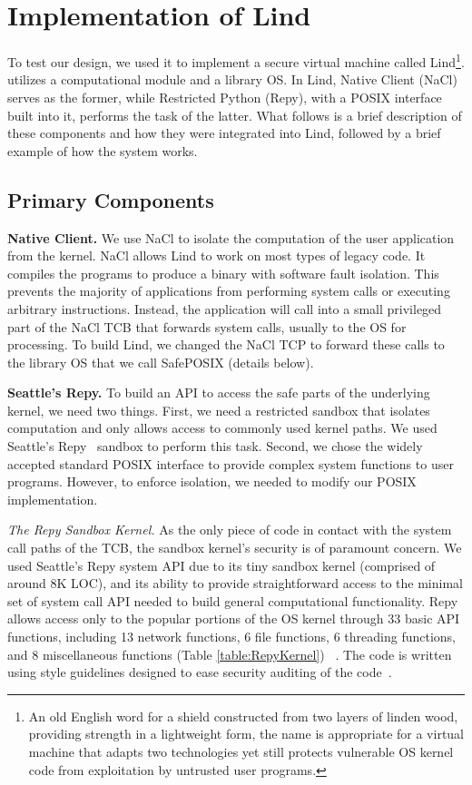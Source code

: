 \section{Implementation of Lind}
\label{sec.implementation}

To test our \lip design, we used it to implement a secure virtual machine
called Lind\footnote{\scriptsize An old English word for a shield constructed from two layers of
linden wood, providing strength in a lightweight form, the name is appropriate for
a virtual machine that adapts two technologies\textendash
yet still protects vulnerable OS kernel code from exploitation by
untrusted user programs.}.
\lip utilizes a computational module and a library OS. In Lind, Native Client (NaCl) serves as the former,
while Restricted Python (Repy), with a POSIX interface built into it, performs the
task of the latter.
What follows is a brief description of these components and how they were integrated
into Lind, followed by a brief example of how the system works.

\subsection{Primary Components}

\textbf{Native Client.}
We use NaCl to isolate the computation of the user application
from the kernel. NaCl allows Lind to work on most types of legacy code.
It compiles the programs to produce a binary with software fault isolation.
This prevents the majority of applications from performing system calls
or executing arbitrary instructions.
Instead, the application will call into a small privileged
part of the NaCl TCB that forwards system calls, usually to the OS for
processing. To build Lind, we changed the NaCl TCP to
forward these calls to the library OS that we call SafePOSIX (details below).

\textbf{Seattle's Repy.}
To build an API to access the safe parts of the underlying kernel, we need
two things. First, we need a restricted sandbox that isolates computation
and only allows access to commonly used kernel paths.  We used
Seattle's Repy~\cite{Repy-10} sandbox to perform this task.
Second, we chose the widely accepted standard POSIX interface to
provide complex system functions to user programs. However, to enforce isolation,
we needed to modify our POSIX implementation.

\textit{The Repy Sandbox Kernel.}
As the only piece of code in contact with the system call paths of the TCB,
the sandbox kernel's security is of paramount concern.
We used Seattle's Repy system API due to its tiny sandbox kernel
(comprised of around 8K LOC), and its ability to provide straightforward
access to the minimal set of system call API needed to build general
computational functionality. Repy allows
access only to the popular portions of the OS kernel through 33 basic API
functions, including 13 network functions, 6 file functions, 6 threading functions,
and 8 miscellaneous functions (Table \ref{table:RepyKernel}) 
~\cite{Repy-10, RepyKernel}. 
The code is written using style guidelines designed to ease security auditing 
of the code~\cite{style}.


